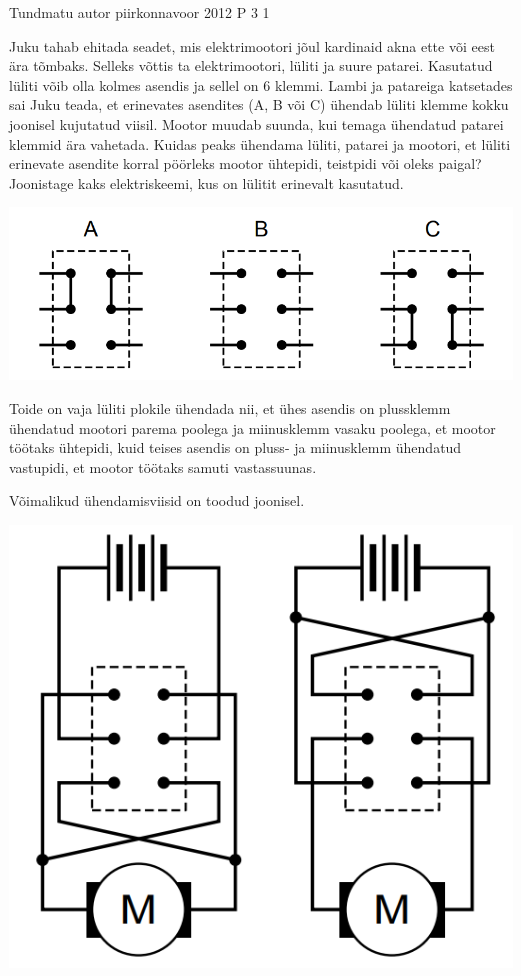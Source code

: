 {Tundmatu autor} %
{piirkonnavoor} %
{2012} %
{P 3} %
{1} %
{
\ifStatement
Juku tahab ehitada seadet, mis elektrimootori jõul kardinaid akna ette või eest ära tõmbaks. Selleks võttis ta elektrimootori, lüliti ja suure patarei. Kasutatud lüliti võib olla kolmes asendis ja sellel on 6 klemmi. Lambi ja patareiga katsetades sai Juku teada, et erinevates asendites (A, B või C) ühendab lüliti klemme kokku joonisel kujutatud viisil. Mootor muudab suunda, kui temaga ühendatud patarei klemmid ära vahetada. Kuidas peaks ühendama lüliti, patarei ja mootori, et lüliti erinevate asendite korral pöörleks mootor ühtepidi, teistpidi või oleks  paigal? Joonistage kaks elektriskeemi, kus on lülitit erinevalt kasutatud.
\begin{center}
	\includegraphics[width=0.5\linewidth]{2012-v2p-03-yl.png}
\end{center}
\fi

\ifHint
Toide on vaja lüliti plokile ühendada nii, et ühes asendis on plussklemm ühendatud mootori parema poolega ja miinusklemm vasaku poolega, et mootor töötaks ühtepidi, kuid teises asendis on pluss- ja miinusklemm ühendatud vastupidi, et mootor töötaks samuti vastassuunas.
\fi

\ifSolution
Võimalikud ühendamisviisid on toodud joonisel.
\begin{center}
	\includegraphics[width=0.5\linewidth]{2012-v2p-03-lah.png}
\end{center}
\fi

}